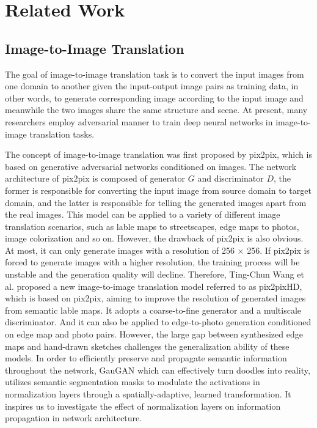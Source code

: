 \documentclass[10pt,twocolumn,letterpaper]{article}
\begin{document}
\section{Related Work}
\subsection{Image-to-Image Translation}
The goal of image-to-image translation task is to convert the input images from one domain to another given the input-output image pairs as training data, in other words, to generate corresponding image according to the input image and meanwhile the two images share the same structure and scene. At present, many researchers employ adversarial manner to train deep neural networks in image-to-image translation tasks\cite{cyclegan,bicyclegan,spagan,munit,crn,cfgan,sis,cfgan,maskgan}.

The concept of image-to-image translation was first proposed by pix2pix\cite{pix2pix}, which is based on generative adversarial networks conditioned on images. 
The network architecture of pix2pix is composed of generator $G$ and discriminator $D$, the former is responsible for converting the input image from source domain to target domain, and the latter is responsible for telling the generated images apart from the real images. 
This model can be applied to a variety of different image translation scenarios, such as lable maps to streetscapes, edge maps to photos, image colorization and so on.
However, the drawback of pix2pix is also obvious. At most, it can only generate images with a resolution of 256 × 256. 
If pix2pix is forced to generate images with a higher resolution, the training process will be unstable and the generation quality will decline. 
Therefore, Ting-Chun Wang et al. proposed a new image-to-image translation model referred to as pix2pixHD\cite{pix2pixhd}, which is based on pix2pix, aiming to improve the resolution of generated images from semantic lable maps. 
It adopts a coarse-to-fine generator and a multiscale discriminator. 
And it can also be applied to edge-to-photo generation conditioned on edge map and photo pairs. 
However, the large gap between synthesized edge maps and hand-drawn sketches challenges the generalization ability of these models.
In order to efficiently preserve and propagate semantic information throughout the network, GauGAN\cite{spade} which can effectively turn doodles into reality, utilizes semantic segmentation masks to modulate the activations in normalization layers through a spatially-adaptive, learned transformation. It inspires us to investigate the effect of normalization layers on information propagation in network architecture.
\end{document}
